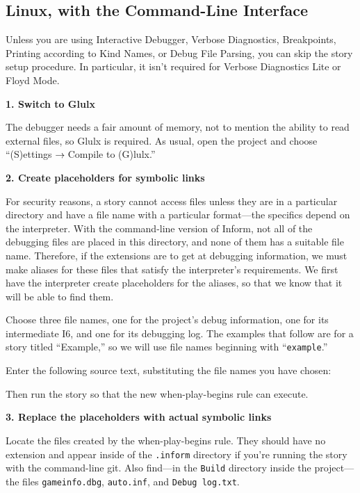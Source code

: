 \documentclass{book}
\newcommand{\lastpagebreak}{\vfill\pagebreak}
\newcommand{\nil}{{\null}}
\newcommand{\thento}{\(\nil\rightarrow\nil\)}
\begin{document}
\lastpagebreak

\subsection{Linux, with the Command-Line Interface}

Unless you are using Interactive Debugger, Verbose Diagnostics, Breakpoints,
Printing according to Kind Names, or Debug File Parsing, you can skip the story
setup procedure.  In particular, it isn't required for Verbose Diagnostics Lite
or Floyd Mode.

\textbf{1. Switch to Glulx}

The debugger needs a fair amount of memory, not to mention the ability to read
external files, so Glulx is required.  As usual, open the project and choose
``(S)ettings\thento Compile to (G)lulx.''

\textbf{2. Create placeholders for symbolic links}

For security reasons, a story cannot access files unless they are in a
particular directory and have a file name with a particular format---the
specifics depend on the interpreter.  With the command-line version of Inform,
not all of the debugging files are placed in this directory, and none of them
has a suitable file name.  Therefore, if the extensions are to get at debugging
information, we must make aliases for these files that satisfy the interpreter's
requirements.  We first have the interpreter create placeholders for the
aliases, so that we know that it will be able to find them.

Choose three file names, one for the project's debug information, one for its
intermediate I6, and one for its debugging log.  The examples that follow are
for a story titled ``Example,'' so we will use file names beginning with
``\texttt{example}.''

Enter the following source text, substituting the file names you have chosen:

\begin{quote}
  
\end{quote}

Then run the story so that the new when-play-begins rule can execute.

\textbf{3. Replace the placeholders with actual symbolic links}

Locate the files created by the when-play-begins rule.  They should have no
extension and appear inside of the \texttt{.inform} directory if you're running
the story with the command-line git.  Also find---in the \texttt{Build}
directory inside the project---the files \texttt{gameinfo.dbg},
\texttt{auto.inf}, and \texttt{Debug log.txt}.
\end{document}
